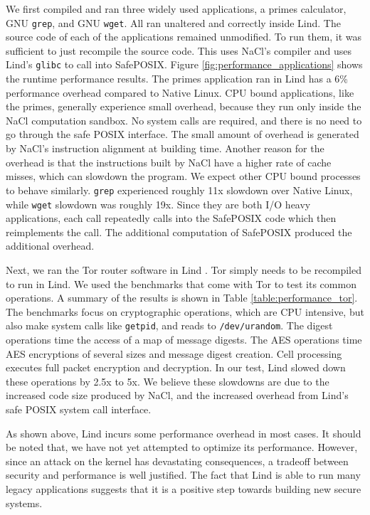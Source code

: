 We first compiled and ran three widely used applications,
a primes calculator, GNU \texttt{grep}, and GNU \texttt{wget}. All ran unaltered and
correctly inside Lind. The source code of each of the applications remained
unmodified. To run them, it was sufficient to just recompile the source code.
This uses NaCl's compiler and uses Lind's \texttt{glibc} to call
into SafePOSIX.
Figure \ref{fig:performance_applications} shows the runtime performance
results.
The primes application ran in Lind has a 6\% performance overhead compared to
Native Linux. CPU bound applications, like the primes, generally experience small overhead,
because they run only inside the NaCl computation sandbox. No system calls are required,
and there is no need to go through the safe POSIX interface. The small amount of overhead
is generated by NaCl's instruction alignment at building time. Another reason for the overhead
is that the instructions built by NaCl have a higher rate of cache misses, which can slowdown the
program.
We expect other CPU bound processes to behave similarly.
\texttt{grep} experienced roughly 11x slowdown over Native Linux, while \texttt{wget}
slowdown was roughly 19x. Since they are both I/O heavy applications,
each call repeatedly calls into the SafePOSIX code which then reimplements
the call.  The additional computation of SafePOSIX produced the additional
overhead.

Next, we ran the Tor router software in Lind . Tor simply
needs to be recompiled to run in Lind.
We used the benchmarks that come with Tor to test its common operations.
A summary of the results is shown in Table \ref{table:performance_tor}. The
benchmarks focus on cryptographic operations,
which are CPU intensive, but also make system calls like \texttt{getpid}, and reads to
\texttt{/dev/urandom}.
The digest operations time the access of a map of message digests.
The AES operations time AES encryptions of several sizes and message
digest creation.
Cell processing executes full packet encryption and decryption. In our
test, Lind slowed down these operations by 2.5x to 5x. We believe these
slowdowns are due to the increased code size produced by NaCl,
and the
increased overhead from Lind's safe POSIX system call interface.

As shown above,  Lind incurs some performance overhead in most cases.
It should be noted that, we have not  yet attempted to optimize its performance.
However, since an attack on the kernel has devastating
consequences, %
a tradeoff between security and performance is well justified.
The fact that Lind is able to run many  legacy applications
suggests that it
is a positive step towards building new secure systems.

